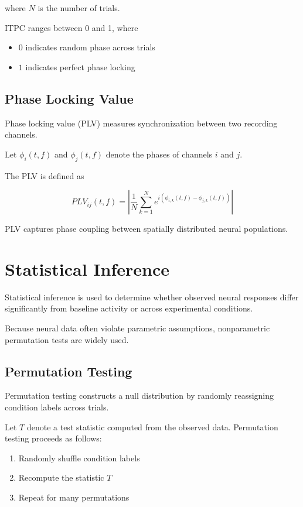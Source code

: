\documentclass[11pt]{report}
\begin{document}
where $N$ is the number of trials.

ITPC ranges between 0 and 1, where

\begin{itemize}
\item $0$ indicates random phase across trials
\item $1$ indicates perfect phase locking
\end{itemize}

\section{Phase Locking Value}

Phase locking value (PLV) measures synchronization between two
recording channels.

Let $\phi_i(t,f)$ and $\phi_j(t,f)$ denote the phases of channels
$i$ and $j$.

The PLV is defined as

\begin{equation}
PLV_{ij}(t,f) =
\left|
\frac{1}{N}
\sum_{k=1}^{N}
e^{i(\phi_{i,k}(t,f)-\phi_{j,k}(t,f))}
\right|
\end{equation}

PLV captures phase coupling between spatially distributed neural
populations.

\chapter{Statistical Inference}

Statistical inference is used to determine whether observed neural
responses differ significantly from baseline activity or across
experimental conditions.

Because neural data often violate parametric assumptions,
nonparametric permutation tests are widely used.

\section{Permutation Testing}

Permutation testing constructs a null distribution by randomly
reassigning condition labels across trials.

Let $T$ denote a test statistic computed from the observed data.
Permutation testing proceeds as follows:

\begin{enumerate}
\item Randomly shuffle condition labels
\item Recompute the statistic $T$
\item Repeat for many permutations
\end{enumerate}
\end{document}
